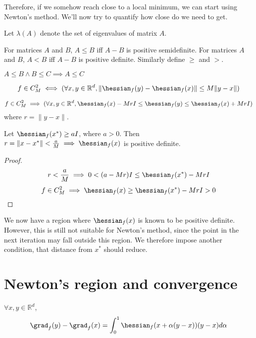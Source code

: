 Therefore, if we somehow reach close to a local minimum, we can start using Newton's method.
We'll now try to quantify how close do we need to get.

\begin{definition}
Let $\lambda(A)$ denote the set of eigenvalues of matrix $A$.
\end{definition}
\begin{definition}
For matrices $A$ and $B$, $A \le B$ iff $A-B$ is positive semidefinite.
For matrices $A$ and $B$, $A < B$ iff $A-B$ is positive definite.
Similarly define $\ge$ and $>$.
\end{definition}
\begin{theorem}
$A \le B \wedge B \le C \implies A \le C$
\end{theorem}
\begin{definition}
\[ f \in C^2_M \iff (\forall x, y \in \mathbb{R}^d, \| \hessian_f(y) - \hessian_f(x) \| \le M \|y - x\|) \]
\end{definition}
\begin{theorem}[Homework]
\[ f \in C^2_M \implies (\forall x, y \in \mathbb{R}^d,
\hessian_f(x) - MrI \le \hessian_f(y) \le \hessian_f(x) + MrI) \]
where $r = \|y-x\|$.
\end{theorem}

\begin{theorem}
Let $\hessian_f(x^*) \ge aI$, where $a > 0$.
Then $r = \|x - x^*\| < \frac{a}{M} \implies \hessian_f(x)$ is positive definite.
\end{theorem}
\begin{proof}
\[ r < \frac{a}{M} \implies 0 < (a - Mr)I \le \hessian_f(x^*) - MrI \]
\[ f \in C^2_M \implies \hessian_f(x) \ge \hessian_f(x^*) - MrI > 0 \]
\end{proof}

We now have a region where $\hessian_f(x)$ is known to be positive definite.
However, this is still not suitable for Newton's method,
since the point in the next iteration may fall outside this region.
We therefore impose another condition, that distance from $x^*$ should reduce.

\section{Newton's region and convergence}

\begin{lemma} \label{thm:hessian-integral}
$\forall x, y \in \mathbb{R}^d$,
\[ \grad_f(y) - \grad_f(x) = \int_0^1 \hessian_f(x + \alpha(y-x)) (y-x) d\alpha \]
\end{lemma}

